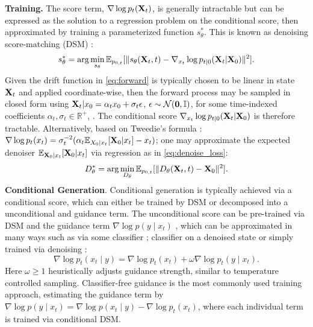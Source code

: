     
    \textbf{Training.} The score term, $\nabla \log p_{t}(\mathbf{X}_t)$, is generally intractable but can be expressed as the solution to a regression problem on the conditional score, then approximated by training a parameterized function $s^*_\theta$. This is known as denoising score-matching (DSM) \citep{song2019generative, vincent2011connection}:
    \begin{align*} 
         s^*_\theta =\arg\min_{s_\theta} \mathbb{E}_{p_{0,t}}[\|s_\theta(\mathbf{X}_{t},t) - \nabla_{x_{t}} \log p_{t|0}(\mathbf{X}_{t}|\mathbf{X}_{0})\|^2].
    \end{align*}
     Given the drift function in \eqref{eq:forward} is typically chosen to be linear in state $\mathbf{X}_t$ and applied coordinate-wise, then the forward process may be sampled in closed form using $\mathbf{X}_t|x_0 = \alpha_t x_0 + \sigma_t\epsilon$, $\epsilon\sim \mathcal{N}(\mathbf{0}, \mathbb{I})$, for some time-indexed coefficients $\alpha_t, \sigma_t \in \mathbb{R}^+$, \citep{sarkka2019applied, song2021scorebased}. The conditional score $\nabla_{x_{t}} \log p_{t|0}(\mathbf{X}_{t}|\mathbf{X}_{0})$ is therefore tractable. Alternatively, based on Tweedie's formula \citep{efron_tweedie, Robbins1956AnEB}: $
    \nabla \log p_t(x_t) = \sigma_t^{-2}(\alpha_t \mathbb{E}_{X_0|x_t}[\mathbf{X}_0 |x_t] - x_t)$; one may approximate the expected denoiser $\mathbb{E}_{\mathbf{X}_0|x_t}[\mathbf{X}_0 |x_t]$ via regression as in \eqref{eq:denoise_loss}:
    \begin{align} \label{eq:denoise_loss}
         D^*_\theta =\arg\min_{D_\theta} \mathbb{E}_{p_{0,t}}[\|D_\theta(\mathbf{X}_{t},t) - \mathbf{X}_{0}\|^2].
    \end{align}
    \textbf{Conditional Generation}.
    Conditional generation is typically achieved via a conditional score, which can either be trained by DSM or decomposed into a unconditional and guidance term. The unconditional score can be pre-trained via DSM and the guidance term $\nabla \log p(y \mid x_t)$ , which can be approximated in many ways such as via some classifier \citep{dhariwal2021diffusion}; classifier on a denoised state \citep{chungdiffusion} or simply trained via denoising \citep{ho2022classifier, denker2024deft}:
    \begin{equation}
        \nabla \log p_t(x_t \mid  y) =  \nabla \log p_t(x_t) + \omega \nabla \log p_t(y \mid x_t).
    \end{equation}
    Here $\omega \geq 1$ heuristically adjusts guidance strength, similar to temperature controlled sampling.  Classifier-free guidance is the most commonly used training approach, estimating the guidance term by $\nabla \log p(y \mid x_t)=\nabla \log p(x_t \mid y) - \nabla \log p_t(x_t)$, where each individual term is trained via conditional DSM. 


